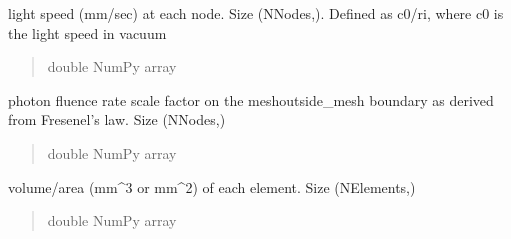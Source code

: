 \documentclass[letterpaper,10pt,english]{sphinxmanual}
\begin{document}
\begin{fulllineitems}
\begin{fulllineitems}
\begin{quote}
\begin{description}
\end{description}\end{quote}

\end{fulllineitems}


\begin{fulllineitems}
\label{\detokenize{_autosummary/nirfasterff.base.stnd_mesh.stndmesh:nirfasterff.base.stnd_mesh.stndmesh.c}}
\pysigstartsignatures
\pysigline
{}
\pysigstopsignatures
\sphinxAtStartPar
light speed (mm/sec) at each node.  Size (NNodes,). Defined as c0/ri, where c0 is the light speed in vacuum
\begin{quote}\begin{description}
\sphinxAtStartPar
double NumPy array

\end{description}\end{quote}

\end{fulllineitems}


\begin{fulllineitems}
\label{\detokenize{_autosummary/nirfasterff.base.stnd_mesh.stndmesh:nirfasterff.base.stnd_mesh.stndmesh.ksi}}
\pysigstartsignatures
\pysigline
{}
\pysigstopsignatures
\sphinxAtStartPar
photon fluence rate scale factor on the mesh\sphinxhyphen{}outside\_mesh boundary as derived from Fresenel’s law. Size (NNodes,)
\begin{quote}\begin{description}
\sphinxAtStartPar
double NumPy array

\end{description}\end{quote}

\end{fulllineitems}


\begin{fulllineitems}
\label{\detokenize{_autosummary/nirfasterff.base.stnd_mesh.stndmesh:nirfasterff.base.stnd_mesh.stndmesh.element_area}}
\pysigstartsignatures
\pysigline
{}
\pysigstopsignatures
\sphinxAtStartPar
volume/area (mm\textasciicircum{}3 or mm\textasciicircum{}2) of each element. Size (NElements,)
\begin{quote}\begin{description}
\sphinxAtStartPar
double NumPy array


\end{description}
\end{quote}
\end{fulllineitems}
\end{fulllineitems}
\end{document}

